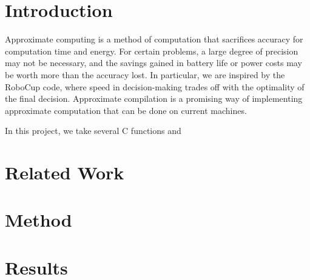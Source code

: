 \documentclass{article}
\begin{document}
\section{Introduction}

Approximate computing is a method of computation that sacrifices accuracy for computation time and energy. For certain problems, a large degree of precision may not be necessary, and the savings gained in battery life or power costs may be worth more than the accuracy lost. In particular, we are inspired by the RoboCup code, where speed in decision-making trades off with the optimality of the final decision. Approximate compilation is a promising way of implementing approximate computation that can be done on current machines.

In this project, we take several C functions and 

\section{Related Work}
\cite{Agarwal09} \cite{Sampson11} \cite{Esmaeilzadeh12} \cite{Venkataramani13} \cite{Amant14}

\section{Method}

\section{Results}



\end{document}
